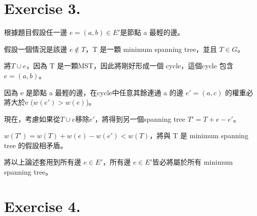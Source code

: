 \documentclass[UTF8, a4paper, 11pt]{report}
\begin{document}
\section*{Exercise 3.}
根據題目假設任一邊 $e = (a, b) \in E'$是節點 a 最輕的邊。

假設一個情況是該邊 $e \notin T$，T 是一顆 minimum spanning tree，並且 $T \in G$。

將$T \cup e$，因為 T 是一顆MST，因此將剛好形成一個 cycle，這個cycle 包含 $e = (a, b)$。

因為 e 是節點 a 最輕的邊，在cycle中任意其餘連通 a 的邊 $e' = (a, c)$ 的權重必將大於e ($w(e') > w(e)$)。

現在，考慮如果從$T \cup e$移除$e'$，將得到另一個spanning tree $T' = T + e - e'$。

$w(T') = w(T) + w(e) - w(e') < w(T)$，將與 T 是 minimum spanning tree 的假設相矛盾。

將以上論述套用到所有邊 $e \in E'$，所有邊 $e \in E'$皆必將屬於所有 minimum spanning tree。

\pagebreak

\section*{Exercise 4.}
\end{document}
